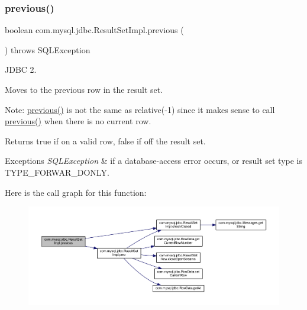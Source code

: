 \subsubsection{\texorpdfstring{previous()}{previous()}}
{\footnotesize\ttfamily boolean com.\+mysql.\+jdbc.\+Result\+Set\+Impl.\+previous (\begin{DoxyParamCaption}{ }\end{DoxyParamCaption}) throws S\+Q\+L\+Exception}

J\+D\+BC 2.

Moves to the previous row in the result set. 

Note\+: \mbox{\hyperlink{classcom_1_1mysql_1_1jdbc_1_1_result_set_impl_ab0f6bcd9030f72eaa84132e0387e6796}{previous()}} is not the same as relative(-\/1) since it makes sense to call \mbox{\hyperlink{classcom_1_1mysql_1_1jdbc_1_1_result_set_impl_ab0f6bcd9030f72eaa84132e0387e6796}{previous()}} when there is no current row. 

\begin{DoxyReturn}{Returns}
true if on a valid row, false if off the result set.
\end{DoxyReturn}

\begin{DoxyExceptions}{Exceptions}
{\em S\+Q\+L\+Exception} & if a database-\/access error occurs, or result set type is T\+Y\+P\+E\+\_\+\+F\+O\+R\+W\+A\+R\+\_\+\+D\+O\+N\+LY. \\
\hline
\end{DoxyExceptions}
Here is the call graph for this function\+:
\nopagebreak
\begin{figure}[H]
\begin{center}
\leavevmode
\includegraphics[width=350pt]{classcom_1_1mysql_1_1jdbc_1_1_result_set_impl_ab0f6bcd9030f72eaa84132e0387e6796_cgraph}
\end{center}
\end{figure}
\mbox{\label{classcom_1_1mysql_1_1jdbc_1_1_result_set_impl_ab017e327bc96791e541af9d87b228472}} 

